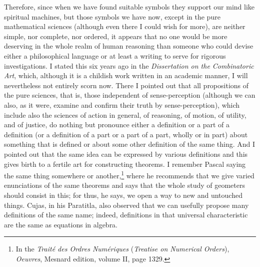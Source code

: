 \documentclass[polutonikogreek,english,twoside,openright]{article}
\begin{document}
Therefore, since when we have found suitable symbols they support our mind
like spiritual machines, but those symbols we have now, except in the pure
mathematical sciences (although even there I could wish for more), are neither
simple, nor complete, nor ordered, it appears that no one would be more
deserving in the whole realm of human reasoning than someone who could devise
either a philosophical language or at least a writing to serve for rigorous
investigations.  I stated this six years ago in the {\em Dissertation on the
Combinatoric Art}, which, although it is a childish work written in an
academic manner, I will nevertheless not entirely scorn now.  There I pointed
out that all propositions of the pure sciences, that is, those independent of
sense-perception (although we can also, as it were, examine and confirm their
truth by sense-perception), which include also the sciences of action in
general, of reasoning, of motion, of utility, and of justice, do nothing but
pronounce either a definition or a part of a definition (or a definition of a
part or a part of a part, wholly or in part) about something that is defined
or about some other definition of the same thing. And I pointed out that the
same idea can be expressed by various definitions and this gives birth to a
fertile art for constructing theorems.  I remember Pascal saying the same
thing somewhere or another,\footnote{In the {\em Trait\'{e} des Ordres Num\'{e}riques} ({\em Treatise on Numerical Orders}), {\em Oeuvres}, Mesnard edition, volume II, page 1329.}  where he recommends that we give varied
enunciations of the same theorems and says that the whole study of geometers
should consist in this; for thus, he says, we open a way to new and untouched
things.  Cujas, in his Paratitla, also observed that we can usefully propose
many definitions of the same name; indeed, definitions in that universal
characteristic are the same as equations in algebra.
\end{document}
